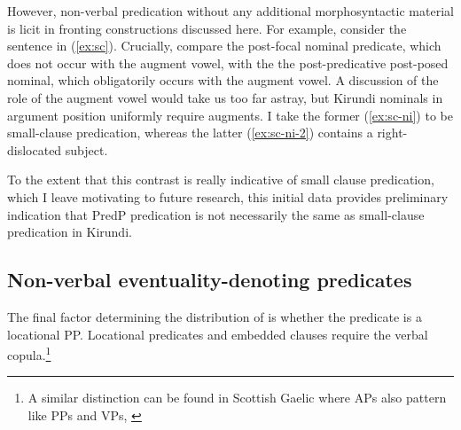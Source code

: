 \documentclass[12pt]{article}
\begin{document}
\bex
{} \label{embed-pred} %
\fex

However, non-verbal predication without any additional morphosyntactic material is licit in fronting constructions discussed here. For example, consider the sentence in (\ref{ex:sc}). Crucially, compare the post-focal nominal predicate, which does not occur with the augment vowel, with the the post-predicative post-posed nominal, which obligatorily occurs with the augment vowel. A discussion of the role of the augment vowel would take us too far astray, but Kirundi nominals in argument position uniformly require augments. I take the former (\ref{ex:sc-ni}) to be small-clause predication, whereas the latter (\ref{ex:sc-ni-2}) contains a right-dislocated subject. 

\bex
\ex {} \label{ex:sc}
\bxl
{} \label{ex:sc-ni}
 \label{ex:sc-ni-2}
\fxl
{} \label{ex:sc-cop}
\fex

To the extent that this contrast is really indicative of small clause predication, which I leave motivating to future research, this initial data provides preliminary indication that PredP predication is not necessarily the same as small-clause predication in Kirundi. 


\subsection{Non-verbal eventuality-denoting predicates}

The final factor determining the distribution of  is whether the predicate is a locational PP. Locational predicates and embedded clauses require the verbal copula.\footnote{A similar distinction can be found in Scottish Gaelic where APs also pattern like PPs and VPs, \citealt{adger-ramchand-2003}}
\end{document}
